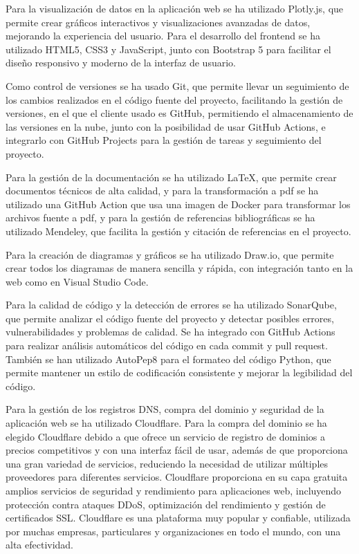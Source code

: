 Para la visualización de datos en la aplicación web se ha utilizado Plotly.js, que permite crear gráficos interactivos y visualizaciones avanzadas de datos, mejorando la experiencia del usuario. Para el desarrollo del frontend se ha utilizado HTML5, CSS3 y JavaScript, junto con Bootstrap 5 para facilitar el diseño responsivo y moderno de la interfaz de usuario.

Como control de versiones se ha usado Git, que permite llevar un seguimiento de los cambios realizados en el código fuente del proyecto, facilitando la gestión de versiones, en el que el cliente usado es GitHub, permitiendo el almacenamiento de las versiones en la nube, junto con la posibilidad de usar GitHub Actions, e integrarlo con GitHub Projects para la gestión de tareas y seguimiento del proyecto. 

Para la gestión de la documentación se ha utilizado LaTeX, que permite crear documentos técnicos de alta calidad, y para la transformación a pdf se ha utilizado una GitHub Action que usa una imagen de Docker para transformar los archivos fuente a pdf, y para la gestión de referencias bibliográficas se ha utilizado Mendeley, que facilita la gestión y citación de referencias en el proyecto.

Para la creación de diagramas y gráficos se ha utilizado Draw.io, que permite crear todos los diagramas de manera sencilla y rápida, con integración tanto en la web como en Visual Studio Code.

Para la calidad de código y la detección de errores se ha utilizado SonarQube, que permite analizar el código fuente del proyecto y detectar posibles errores, vulnerabilidades y problemas de calidad. Se ha integrado con GitHub Actions para realizar análisis automáticos del código en cada commit y pull request. También se han utilizado AutoPep8 para el formateo del código Python, que permite mantener un estilo de codificación consistente y mejorar la legibilidad del código.

Para la gestión de los registros DNS, compra del dominio y seguridad de la aplicación web se ha utilizado Cloudflare. Para la compra del dominio se ha elegido Cloudflare debido a que ofrece un servicio de registro de dominios a precios competitivos y con una interfaz fácil de usar, además de que proporciona una gran variedad de servicios, reduciendo la necesidad de utilizar múltiples proveedores para diferentes servicios. Cloudflare proporciona en su capa gratuita amplios servicios de seguridad y rendimiento para aplicaciones web, incluyendo protección contra ataques DDoS, optimización del rendimiento y gestión de certificados SSL. Cloudflare es una plataforma muy popular y confiable, utilizada por muchas empresas, particulares y organizaciones en todo el mundo, con una alta efectividad. ~\cite{Nadeem2023,Adhar2023}

